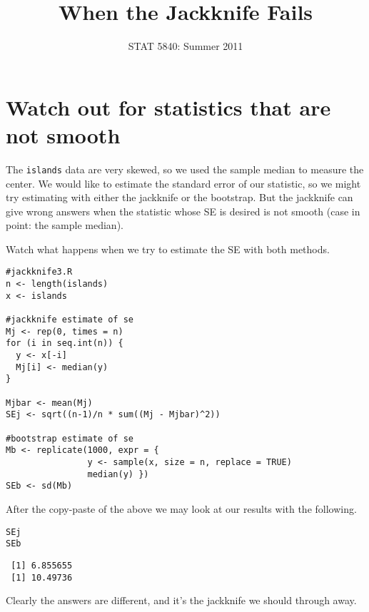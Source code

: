 \documentclass[11pt,english]{article}
\title{When the Jackknife Fails}
\date{STAT 5840: Summer 2011}
\begin{document}
\maketitle

\thispagestyle{empty}

\section*{Watch out for statistics that are not smooth}
\label{sec-1}

The \texttt{islands} data are very skewed, so we used the sample median to measure the center.  We would like to estimate the standard error of our statistic, so we might try estimating with either the jackknife or the bootstrap.  But the jackknife can give wrong answers when the statistic whose SE is desired is not smooth (case in point: the sample median).

Watch what happens when we try to estimate the SE with both methods.

\begin{verbatim}
#jackknife3.R
n <- length(islands)
x <- islands

#jackknife estimate of se
Mj <- rep(0, times = n)
for (i in seq.int(n)) {  
  y <- x[-i]
  Mj[i] <- median(y)
}

Mjbar <- mean(Mj)
SEj <- sqrt((n-1)/n * sum((Mj - Mjbar)^2))

#bootstrap estimate of se
Mb <- replicate(1000, expr = {
                y <- sample(x, size = n, replace = TRUE)
                median(y) })
SEb <- sd(Mb)
\end{verbatim}






After the copy-paste of the above we may look at our results with the following.

\begin{verbatim}
SEj
SEb
\end{verbatim}




\begin{verbatim}
 [1] 6.855655
 [1] 10.49736
\end{verbatim}


Clearly the answers are different, and it's the jackknife we should through away.
\end{document}
